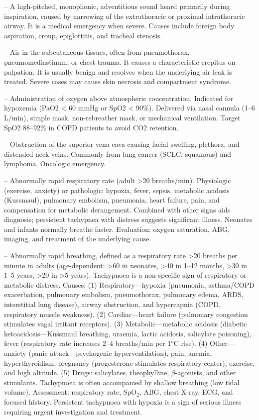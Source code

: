-- A high-pitched, monophonic, adventitious sound heard primarily during inspiration, caused by narrowing of the extrathoracic or proximal intrathoracic airway. It is a medical emergency when severe. Causes include foreign body aspiration, croup, epiglottitis, and tracheal stenosis.

-- Air in the subcutaneous tissues, often from pneumothorax, pneumomediastinum, or chest trauma. It causes a characteristic crepitus on palpation. It is usually benign and resolves when the underlying air leak is treated. Severe cases may cause skin necrosis and compartment syndrome.

-- Administration of oxygen above atmospheric concentration. Indicated for hypoxemia (PaO2 < 60 mmHg or SpO2 < 90\%). Delivered via nasal cannula (1--6 L/min), simple mask, non-rebreather mask, or mechanical ventilation. Target SpO2 88--92\% in COPD patients to avoid CO2 retention.

-- Obstruction of the superior vena cava causing facial swelling, plethora, and distended neck veins. Commonly from lung cancer (SCLC, squamous) and lymphoma. Oncologic emergency.

-- Abnormally rapid respiratory rate (adult >20 breaths/min). Physiologic (exercise, anxiety) or pathologic: hypoxia, fever, sepsis, metabolic acidosis (Kussmaul), pulmonary embolism, pneumonia, heart failure, pain, and compensation for metabolic derangement. Combined with other signs aids diagnosis; persistent tachypnea with distress suggests significant illness. Neonates and infants normally breathe faster. Evaluation: oxygen saturation, ABG, imaging, and treatment of the underlying cause.

-- Abnormally rapid breathing, defined as a respiratory rate >20 breaths per minute in adults (age-dependent: >60 in neonates, >40 in 1--12 months, >30 in 1--5 years, >20 in >5 years). Tachypnoea is a non-specific sign of respiratory or metabolic distress. Causes: (1) Respiratory—hypoxia (pneumonia, asthma/COPD exacerbation, pulmonary embolism, pneumothorax, pulmonary edema, ARDS, interstitial lung disease), airway obstruction, and hypercapnia (COPD, respiratory muscle weakness). (2) Cardiac—heart failure (pulmonary congestion stimulates vagal irritant receptors). (3) Metabolic—metabolic acidosis (diabetic ketoacidosis—Kussmaul breathing, uraemia, lactic acidosis, salicylate poisoning), fever (respiratory rate increases 2--4 breaths/min per 1°C rise). (4) Other—anxiety (panic attack—psychogenic hyperventilation), pain, anemia, hyperthyroidism, pregnancy (progesterone stimulates respiratory center), exercise, and high altitude. (5) Drugs: salicylates, theophylline, $\beta$-agonists, and other stimulants. Tachypnoea is often accompanied by shallow breathing (low tidal volume). Assessment: respiratory rate, SpO$_2$, ABG, chest X-ray, ECG, and focused history. Persistent tachypnoea with hypoxia is a sign of serious illness requiring urgent investigation and treatment.

